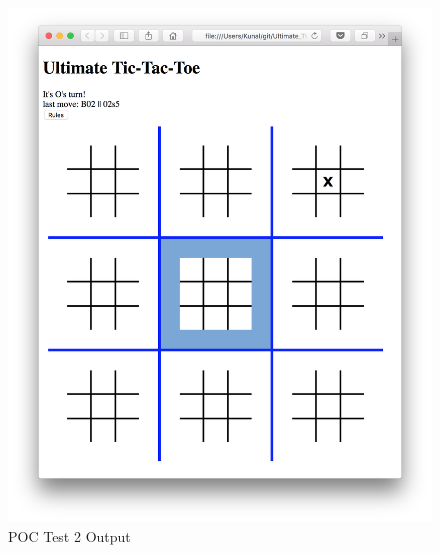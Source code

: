 \documentclass[12pt, titlepage]{article}
\begin{document}
\begin{figure}
  \includegraphics[width=\linewidth]{Figures/Test2-output.png}
  \caption{POC Test 2 Output}
  \label{fig:Test2_output}
\end{figure}
\end{document}
